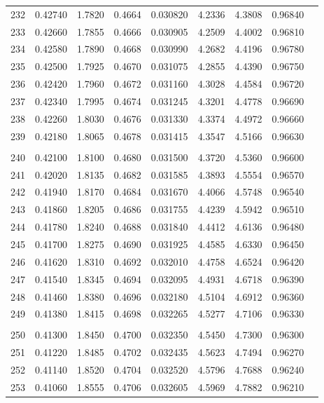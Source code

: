 \documentclass[letter,twosides,10pt]{article}
\begin{document}
\begin{longtable}{|c|c|c|c|c|c|c|c|c|}
232 & 0.42740 & 1.7820 & 0.4664 & 0.030820 & 4.2336 &  4.3808 & 0.96840 \\
233 & 0.42660 & 1.7855 & 0.4666 & 0.030905 & 4.2509 &  4.4002 & 0.96810 \\
234 & 0.42580 & 1.7890 & 0.4668 & 0.030990 & 4.2682 &  4.4196 & 0.96780 \\
235 & 0.42500 & 1.7925 & 0.4670 & 0.031075 & 4.2855 &  4.4390 & 0.96750 \\
236 & 0.42420 & 1.7960 & 0.4672 & 0.031160 & 4.3028 &  4.4584 & 0.96720 \\
237 & 0.42340 & 1.7995 & 0.4674 & 0.031245 & 4.3201 &  4.4778 & 0.96690 \\
238 & 0.42260 & 1.8030 & 0.4676 & 0.031330 & 4.3374 &  4.4972 & 0.96660 \\
239 & 0.42180 & 1.8065 & 0.4678 & 0.031415 & 4.3547 &  4.5166 & 0.96630 \\
 & & & & & & & \\
240 & 0.42100 & 1.8100 & 0.4680 & 0.031500 & 4.3720 &  4.5360 & 0.96600 \\
241 & 0.42020 & 1.8135 & 0.4682 & 0.031585 & 4.3893 &  4.5554 & 0.96570 \\
242 & 0.41940 & 1.8170 & 0.4684 & 0.031670 & 4.4066 &  4.5748 & 0.96540 \\
243 & 0.41860 & 1.8205 & 0.4686 & 0.031755 & 4.4239 &  4.5942 & 0.96510 \\
244 & 0.41780 & 1.8240 & 0.4688 & 0.031840 & 4.4412 &  4.6136 & 0.96480 \\
245 & 0.41700 & 1.8275 & 0.4690 & 0.031925 & 4.4585 &  4.6330 & 0.96450 \\
246 & 0.41620 & 1.8310 & 0.4692 & 0.032010 & 4.4758 &  4.6524 & 0.96420 \\
247 & 0.41540 & 1.8345 & 0.4694 & 0.032095 & 4.4931 &  4.6718 & 0.96390 \\
248 & 0.41460 & 1.8380 & 0.4696 & 0.032180 & 4.5104 &  4.6912 & 0.96360 \\
249 & 0.41380 & 1.8415 & 0.4698 & 0.032265 & 4.5277 &  4.7106 & 0.96330 \\
 & & & & & & & \\
250 & 0.41300 & 1.8450 & 0.4700 & 0.032350 & 4.5450 &  4.7300 & 0.96300 \\
251 & 0.41220 & 1.8485 & 0.4702 & 0.032435 & 4.5623 &  4.7494 & 0.96270 \\
252 & 0.41140 & 1.8520 & 0.4704 & 0.032520 & 4.5796 &  4.7688 & 0.96240 \\
253 & 0.41060 & 1.8555 & 0.4706 & 0.032605 & 4.5969 &  4.7882 & 0.96210 \\

\end{longtable}
\end{document}

